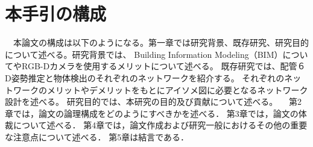 \section{本手引の構成}
　本論文の構成は以下のようになる。第一章では研究背景、既存研究、研究目的について述べる。研究背景では、
Building Information Modeling（BIM）についてやRGB-Dカメラを使用するメリットについて述べる。
既存研究では、配管６D姿勢推定と物体検出のそれぞれのネットワークを紹介する。
それぞれのネットワークのメリットやデメリットをもとにアイソメ図に必要となるネットワーク設計を述べる。
研究目的では、本研究の目的及び貢献について述べる。
　第2章では，論文の論理構成をどのようにすべきかを述べる．
第3章では，論文の体裁について述べる．
第4章では，論文作成および研究一般におけるその他の重要な注意点について述べる．
第5章は結言である．
